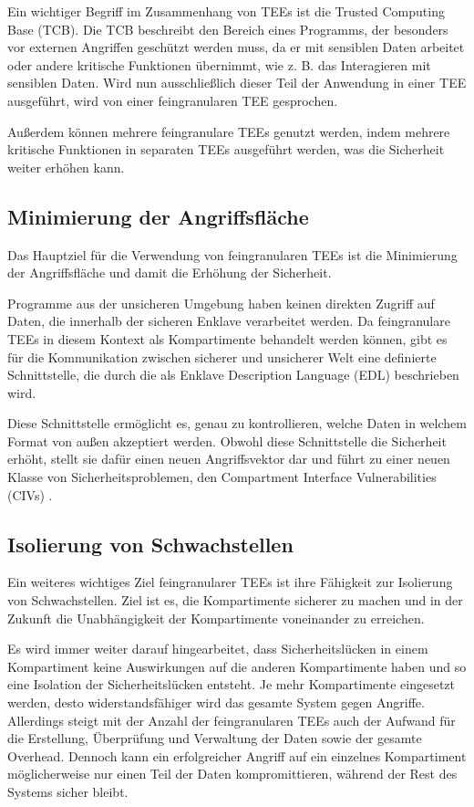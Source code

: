 Ein wichtiger Begriff im Zusammenhang von TEEs ist die Trusted Computing Base (TCB). Die TCB beschreibt den Bereich eines Programms, der besonders vor externen Angriffen geschützt werden muss, da er mit sensiblen Daten arbeitet oder andere kritische Funktionen übernimmt, wie z. B. das Interagieren mit sensiblen Daten. Wird nun ausschließlich dieser Teil der Anwendung in einer TEE ausgeführt, wird von einer feingranularen TEE gesprochen.

Außerdem können mehrere feingranulare TEEs genutzt werden, indem mehrere kritische Funktionen in separaten TEEs ausgeführt werden, was die Sicherheit weiter erhöhen kann.

\subsection{Minimierung der Angriffsfläche}
Das Hauptziel für die Verwendung von feingranularen TEEs ist die Minimierung der Angriffsfläche und damit die Erhöhung der Sicherheit. 

Programme aus der unsicheren Umgebung haben keinen direkten Zugriff auf Daten, die innerhalb der sicheren Enklave verarbeitet werden. Da feingranulare TEEs in diesem Kontext als Kompartimente behandelt werden können, gibt es für die Kommunikation zwischen sicherer und unsicherer Welt eine definierte Schnittstelle, die durch die als Enklave Description Language (EDL) beschrieben wird. 

Diese Schnittstelle ermöglicht es, genau zu kontrollieren, welche Daten in welchem Format von außen akzeptiert werden. Obwohl diese Schnittstelle die Sicherheit erhöht, stellt sie dafür einen neuen Angriffsvektor dar und führt zu einer neuen Klasse von Sicherheitsproblemen, den Compartment Interface Vulnerabilities (CIVs) \cite{CIVPaper}.

\subsection{Isolierung von Schwachstellen}
Ein weiteres wichtiges Ziel feingranularer TEEs ist ihre Fähigkeit zur Isolierung von Schwachstellen. Ziel ist es, die Kompartimente sicherer zu machen und in der Zukunft die Unabhängigkeit der Kompartimente voneinander zu erreichen.


Es wird immer weiter darauf hingearbeitet, dass Sicherheitslücken in einem Kompartiment keine Auswirkungen auf die anderen Kompartimente haben und so eine Isolation der Sicherheitslücken entsteht. Je mehr Kompartimente eingesetzt werden, desto widerstandsfähiger wird das gesamte System gegen Angriffe. Allerdings steigt mit der Anzahl der feingranularen TEEs auch der Aufwand für die Erstellung, Überprüfung und Verwaltung der Daten sowie der gesamte Overhead. Dennoch kann ein erfolgreicher Angriff auf ein einzelnes Kompartiment möglicherweise nur einen Teil der Daten kompromittieren, während der Rest des Systems sicher bleibt.
